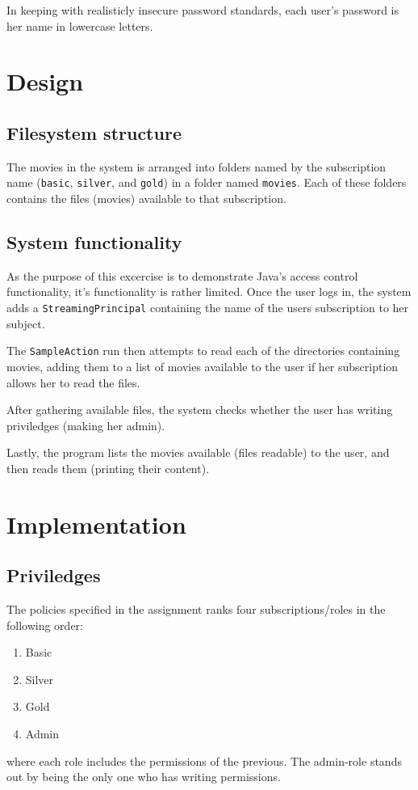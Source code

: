 \documentclass{article}
\begin{document}
In keeping with realisticly insecure password standards,
each user's password is her name in lowercase letters.

\section{Design}

\subsection{Filesystem structure}
The movies in the system is arranged into folders
named by the subscription name (\texttt{basic},
\texttt{silver}, and \texttt{gold})
in a folder named \texttt{movies}. Each of these
folders contains the files (movies) available
to that subscription.

\subsection{System functionality}
As the purpose of this excercise is to demonstrate
Java's access control functionality, it's functionality
is rather limited.
Once the user logs in, the system adds a
\texttt{StreamingPrincipal} containing
the name of the users subscription to her
subject.

The \texttt{SampleAction} run then attempts
to read each of the directories containing movies,
adding them to a list of movies available to
the user if her subscription allows her to 
read the files.

After gathering available files, the system 
checks whether the user has writing priviledges
(making her admin).

Lastly, the program lists the movies available
(files readable) to the user, and then reads
them (printing their content).

\section{Implementation}

\subsection{Priviledges}
The policies specified in the assignment ranks four
subscriptions/roles in the following order:
\begin{enumerate}
	\item Basic
	\item Silver
	\item Gold
	\item Admin
\end{enumerate}
where each role includes the permissions of the previous.
The admin-role stands out by being the only one
who has writing permissions.
\end{document}
